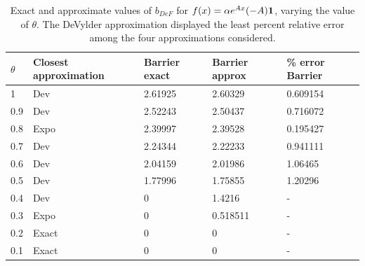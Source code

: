 \begin{table}[!h]
\begin{tabular}{|l|l|l|l|l|}
\hline
$\theta$ & Closest approximation & Barrier exact & Barrier approx & \% error Barrier \\ \hline
1   & Dev                     & 2.61925         & 2.60329  & 0.609154           \\ \hline
0.9 & Dev                     & 2.52243         & 2.50437  & 0.716072           \\ \hline
0.8 & Expo                    & 2.39997         & 2.39528  & 0.195427           \\ \hline
0.7 & Dev                     & 2.24344         & 2.22233  & 0.941111           \\ \hline
0.6 & Dev                     & 2.04159         & 2.01986  & 1.06465            \\ \hline
0.5 & Dev                     & 1.77996         & 1.75855  & 1.20296            \\ \hline
0.4 & Dev                     & 0               & 1.4216   & -                  \\ \hline
0.3 & Expo                    & 0               & 0.518511 & -                  \\ \hline
0.2 & Exact                   & 0               & 0        & -                  \\ \hline
0.1 & Exact                   & 0               & 0        & -                  \\ \hline
\end{tabular}
\caption{Exact and approximate values of $b_{DeF}$ for $f(x)=\alpha e^{A x} (-A) {\mbox{\boldmath$1$}} $, varying the value of $\theta$.  The DeVylder approximation displayed the least percent relative error among the four approximations considered.}
\label{table:MatExp6220Bar}
\end{table}